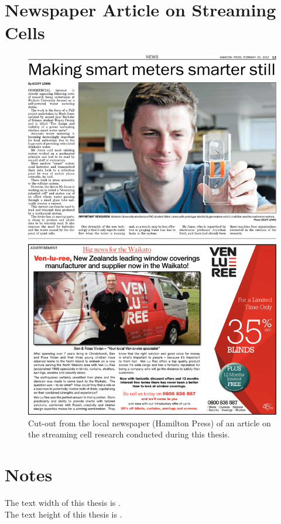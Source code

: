   \chapter*{Newspaper Article on Streaming Cells}
  \begin{figure}
      \centering
      \includegraphics[width=\textwidth]{content/appendices/Article}
      \caption{Cut-out from the local newspaper (Hamilton Press) of an article on the streaming cell research conducted during this thesis.}
  \end{figure}

\chapter*{Notes}
The text width of this thesis is \the\textwidth.\\
The text height of this thesis is \the\textheight.





